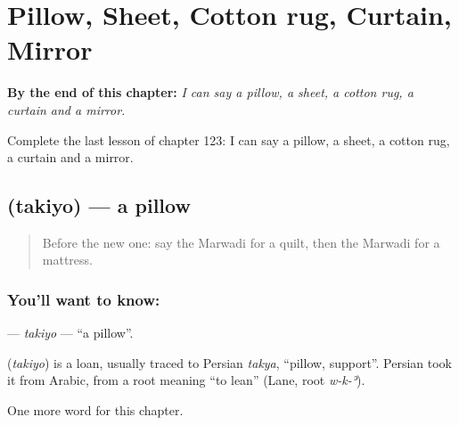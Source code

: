 
\chapter{Pillow, Sheet, Cotton rug, Curtain, Mirror}
\label{ch:mw-pillow-sheet-cotton-rug-curtain-mirror}

\begin{chapteropening}
\textbf{By the end of this chapter:} \emph{I can say a pillow, a sheet, a cotton rug, a curtain and a mirror.}

Complete the last lesson of chapter 123: I can say a pillow, a sheet, a cotton rug, a curtain and a mirror.
\end{chapteropening}

\section[\texorpdfstring{\mw{तकियो} (takiyo)}{तकियो (takiyo)}]{ (takiyo) — a pillow}

\label{lesson:MW-C123-takiyo}



\begin{quote}
Before the new one: say the Marwadi for a quilt, then the Marwadi for a mattress.
\end{quote}

\subsection*{You'll want to know: }
\textbf{} — \emph{takiyo} — \textquotedblleft{}a pillow\textquotedblright{}.

\begin{cousinweb}
\textbf{} (\emph{takiyo}) is a loan, usually traced to Persian \emph{takya}, \textquotedblleft{}pillow, support\textquotedblright{}. Persian took it from Arabic, from a root meaning \textquotedblleft{}to lean\textquotedblright{} (Lane, root \emph{w-k-ʾ}).
\end{cousinweb}

\begin{grammarlens}[title={What you've built}]
One more word for this chapter.
\end{grammarlens}

